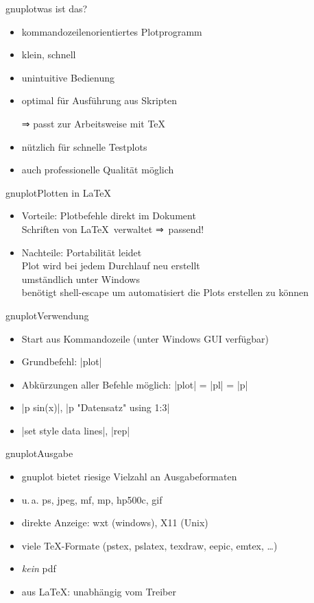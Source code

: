 \documentclass[
	vorläufig=false,
	datum=2022-11-09,
	titel={Mathematiksatz},
	web=false,
	max,
	aspectratio=1610,
]{../tex/latexkurs-slides}
\begin{document}
\begin{frame}{gnuplot}{was ist das?}
\begin{itemize}
\item kommandozeilenorientiertes Plotprogramm
\item klein, schnell
\item unintuitive Bedienung
\item optimal für Ausführung aus Skripten
\item[⇒] passt zur Arbeitsweise mit \TeX
\item nützlich für schnelle Testplots
\item auch professionelle Qualität möglich
\end{itemize}
\end{frame}

\begin{frame}{gnuplot}{Plotten in \LaTeX}
\begin{itemize}
\item {Vorteile}: Plotbefehle direkt im Dokument\\%
  Schriften von \LaTeX\ verwaltet ⇒  passend!
\item {Nachteile}: Portabilität leidet\\%
  Plot wird bei jedem Durchlauf neu erstellt\\%
  umständlich unter Windows\\%
  benötigt shell-escape um automatisiert die Plots erstellen zu können
\end{itemize}
\end{frame}

\begin{frame}[fragile]{gnuplot}{Verwendung}
\begin{itemize}
\item Start aus Kommandozeile (unter Windows GUI verfügbar)
\item Grundbefehl: |plot|
\item Abkürzungen aller Befehle möglich: |plot| = |pl| = |p|
\item |p sin(x)|, |p "Datensatz" using 1:3|
\item |set style data lines|, |rep|
\end{itemize}
\end{frame}

\begin{frame}[fragile]{gnuplot}{Ausgabe}
\begin{itemize}
\item gnuplot bietet riesige Vielzahl an Ausgabeformaten
\item u.\,a. ps, jpeg, mf, mp, hp500c, gif
\item direkte Anzeige: wxt (windows), X11 (Unix)
\item viele \TeX-Formate (pstex, pslatex, texdraw, eepic, emtex, \dots)
\item \emph{kein} pdf
\item aus \LaTeX: unabhängig vom Treiber
\end{itemize}
\end{frame}
\end{document}
